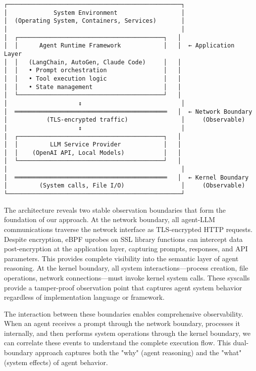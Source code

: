 \begin{center}
\begin{Verbatim}[fontsize=\small, commandchars=\\\{\}]
┌─────────────────────────────────────────────────┐
│             System Environment                  │
│  (Operating System, Containers, Services)       │
│                                                 │
│  ┌─────────────────────────────────────────┐   │
│  │      Agent Runtime Framework            │   │  ← Application Layer
│  │   (LangChain, AutoGen, Claude Code)     │   │
│  │   • Prompt orchestration                │   │
│  │   • Tool execution logic                │   │
│  │   • State management                    │   │
│  └─────────────────────────────────────────┘   │
│                    ↕                            │
│  ═══════════════════════════════════════════   │  ← Network Boundary
│           (TLS-encrypted traffic)               │     (Observable)
│                    ↕                            │
│  ┌─────────────────────────────────────────┐   │
│  │         LLM Service Provider            │   │
│  │    (OpenAI API, Local Models)           │   │
│  └─────────────────────────────────────────┘   │
│                                                 │
│  ═══════════════════════════════════════════   │  ← Kernel Boundary
│         (System calls, File I/O)                │     (Observable)
└─────────────────────────────────────────────────┘
\end{Verbatim}
\end{center}

The architecture reveals two stable observation boundaries that form the foundation of our approach. At the network boundary, all agent-LLM communications traverse the network interface as TLS-encrypted HTTP requests. Despite encryption, eBPF uprobes on SSL library functions can intercept data post-encryption at the application layer, capturing prompts, responses, and API parameters. This provides complete visibility into the semantic layer of agent reasoning. At the kernel boundary, all system interactions—process creation, file operations, network connections—must invoke kernel system calls. These syscalls provide a tamper-proof observation point that captures agent system behavior regardless of implementation language or framework.

The interaction between these boundaries enables comprehensive observability. When an agent receives a prompt through the network boundary, processes it internally, and then performs system operations through the kernel boundary, we can correlate these events to understand the complete execution flow. This dual-boundary approach captures both the "why" (agent reasoning) and the "what" (system effects) of agent behavior.

